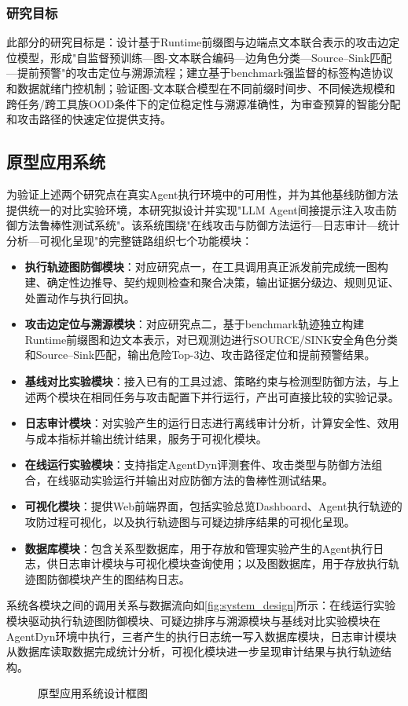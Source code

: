 \subsubsection{研究目标}
此部分的研究目标是：设计基于Runtime前缀图与边端点文本联合表示的攻击边定位模型，形成"自监督预训练—图-文本联合编码—边角色分类—Source--Sink匹配—提前预警"的攻击定位与溯源流程；建立基于benchmark强监督的标签构造协议和数据就绪门控机制；验证图-文本联合模型在不同前缀时间步、不同候选规模和跨任务/跨工具族OOD条件下的定位稳定性与溯源准确性，为审查预算的智能分配和攻击路径的快速定位提供支持。

\subsection{原型应用系统}

为验证上述两个研究点在真实Agent执行环境中的可用性，并为其他基线防御方法提供统一的对比实验环境，本研究拟设计并实现"LLM Agent间接提示注入攻击防御方法鲁棒性测试系统"。该系统围绕"在线攻击与防御方法运行—日志审计—统计分析—可视化呈现"的完整链路组织七个功能模块：

\begin{itemize}[leftmargin=2em,itemsep=0pt]
  \item \textbf{执行轨迹图防御模块}：对应研究点一，在工具调用真正派发前完成统一图构建、确定性边推导、契约规则检查和聚合决策，输出证据分级边、规则见证、处置动作与执行回执。
  \item \textbf{攻击边定位与溯源模块}：对应研究点二，基于benchmark轨迹独立构建Runtime前缀图和边文本表示，对已观测边进行SOURCE/SINK安全角色分类和Source--Sink匹配，输出危险Top-3边、攻击路径定位和提前预警结果。
  \item \textbf{基线对比实验模块}：接入已有的工具过滤、策略约束与检测型防御方法，与上述两个模块在相同任务与攻击配置下并行运行，产出可直接比较的实验记录。
  \item \textbf{日志审计模块}：对实验产生的运行日志进行离线审计分析，计算安全性、效用与成本指标并输出统计结果，服务于可视化模块。
  \item \textbf{在线运行实验模块}：支持指定AgentDyn评测套件、攻击类型与防御方法组合，在线驱动实验运行并输出对应防御方法的鲁棒性测试结果。
  \item \textbf{可视化模块}：提供Web前端界面，包括实验总览Dashboard、Agent执行轨迹的攻防过程可视化，以及执行轨迹图与可疑边排序结果的可视化呈现。
  \item \textbf{数据库模块}：包含关系型数据库，用于存放和管理实验产生的Agent执行日志，供日志审计模块与可视化模块查询使用；以及图数据库，用于存放执行轨迹图防御模块产生的图结构日志。
\end{itemize}

系统各模块之间的调用关系与数据流向如\autoref{fig:system_design}所示：在线运行实验模块驱动执行轨迹图防御模块、可疑边排序与溯源模块与基线对比实验模块在AgentDyn环境中执行，三者产生的执行日志统一写入数据库模块，日志审计模块从数据库读取数据完成统计分析，可视化模块进一步呈现审计结果与执行轨迹结构。

\begin{figure}[htbp]
  \centering
  \resizebox{0.9\textwidth}{!}{}
  \caption{原型应用系统设计框图}
  \label{fig:system_design}
\end{figure}
